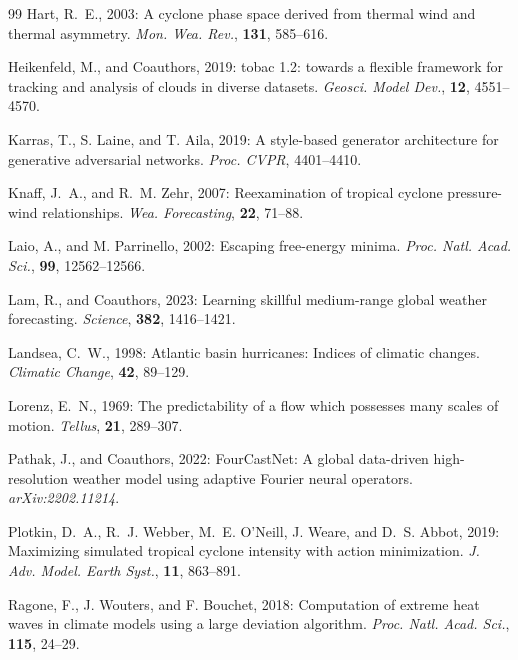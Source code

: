 \documentclass[11pt]{article}
\begin{document}
\begin{thebibliography}{99}
Hart, R.~E., 2003: A cyclone phase space derived from thermal wind and thermal asymmetry. \textit{Mon. Wea. Rev.}, \textbf{131}, 585--616.

Heikenfeld, M., and Coauthors, 2019: tobac 1.2: towards a flexible framework for tracking and analysis of clouds in diverse datasets. \textit{Geosci. Model Dev.}, \textbf{12}, 4551--4570.

Karras, T., S. Laine, and T. Aila, 2019: A style-based generator architecture for generative adversarial networks. \textit{Proc. CVPR}, 4401--4410.

Knaff, J.~A., and R.~M. Zehr, 2007: Reexamination of tropical cyclone pressure-wind relationships. \textit{Wea. Forecasting}, \textbf{22}, 71--88.

Laio, A., and M. Parrinello, 2002: Escaping free-energy minima. \textit{Proc. Natl. Acad. Sci.}, \textbf{99}, 12562--12566.

Lam, R., and Coauthors, 2023: Learning skillful medium-range global weather forecasting. \textit{Science}, \textbf{382}, 1416--1421.

Landsea, C.~W., 1998: Atlantic basin hurricanes: Indices of climatic changes. \textit{Climatic Change}, \textbf{42}, 89--129.

Lorenz, E.~N., 1969: The predictability of a flow which possesses many scales of motion. \textit{Tellus}, \textbf{21}, 289--307.

Pathak, J., and Coauthors, 2022: FourCastNet: A global data-driven high-resolution weather model using adaptive Fourier neural operators. \textit{arXiv:2202.11214}.

Plotkin, D.~A., R.~J. Webber, M.~E. O'Neill, J. Weare, and D.~S. Abbot, 2019: Maximizing simulated tropical cyclone intensity with action minimization. \textit{J. Adv. Model. Earth Syst.}, \textbf{11}, 863--891.

Ragone, F., J. Wouters, and F. Bouchet, 2018: Computation of extreme heat waves in climate models using a large deviation algorithm. \textit{Proc. Natl. Acad. Sci.}, \textbf{115}, 24--29.


\end{thebibliography}
\end{document}
